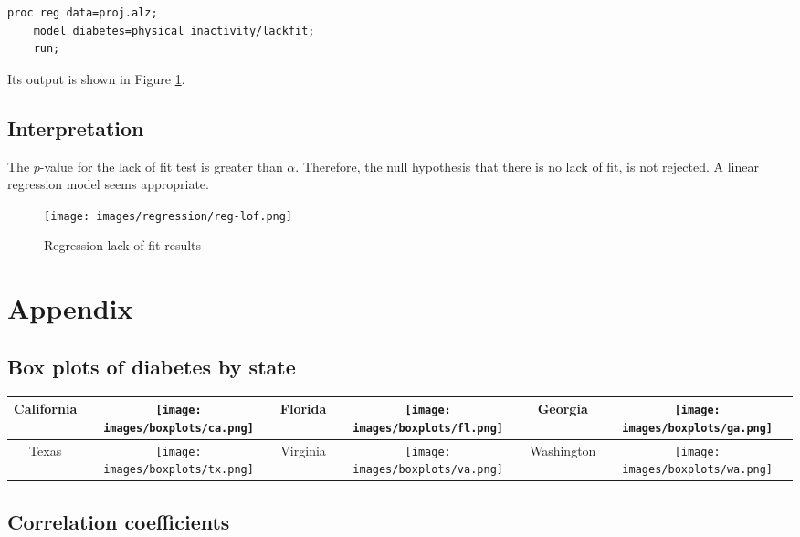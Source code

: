 \documentclass{article}
\begin{document}
\begin{lstlisting}[language=SAS,caption=SAS program for lack of fit test,captionpos=b,label=lst:reg-lof]
    proc reg data=proj.alz;
    model diabetes=physical_inactivity/lackfit;
    run;
\end{lstlisting}

Its output is shown in Figure \ref{fig:reg-lof}.

\subsection{Interpretation}
The $p$-value for the lack of fit test is greater than $\alpha$. Therefore, the null hypothesis that there is no lack of fit, is not rejected. A linear regression model seems appropriate.

\begin{figure}[ht]
    \centering
    \texttt{[image: images/regression/reg-lof.png]}
    \caption{Regression lack of fit results}
    \label{fig:reg-lof}
\end{figure}

\clearpage

\section{Appendix} \label{appendix}

\subsection{Box plots of diabetes by state} \label{appendix:boxplots}
\begin{table}[ht]
\centering
    \begin{tabular}{|cc|cc|cc|}
    \hline
         California &  \texttt{[image: images/boxplots/ca.png]}  & Florida  & \texttt{[image: images/boxplots/fl.png]} & Georgia & \texttt{[image: images/boxplots/ga.png]} \\
         \hline
         Texas & \texttt{[image: images/boxplots/tx.png]} & Virginia  & \texttt{[image: images/boxplots/va.png]} & Washington  & \texttt{[image: images/boxplots/wa.png]} \\
         \hline
    \end{tabular}
    
\end{table}

\clearpage

\subsection{Correlation coefficients} \label{appendix:corr}
\end{document}
